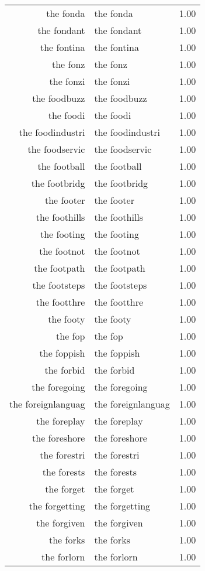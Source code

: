 \begin{table}[ht]
\begin{tabular}{rlr}
  the fonda & the fonda & 1.00 \\ 
  the fondant & the fondant & 1.00 \\ 
  the fontina & the fontina & 1.00 \\ 
  the fonz & the fonz & 1.00 \\ 
  the fonzi & the fonzi & 1.00 \\ 
  the foodbuzz & the foodbuzz & 1.00 \\ 
  the foodi & the foodi & 1.00 \\ 
  the foodindustri & the foodindustri & 1.00 \\ 
  the foodservic & the foodservic & 1.00 \\ 
  the football & the football & 1.00 \\ 
  the footbridg & the footbridg & 1.00 \\ 
  the footer & the footer & 1.00 \\ 
  the foothills & the foothills & 1.00 \\ 
  the footing & the footing & 1.00 \\ 
  the footnot & the footnot & 1.00 \\ 
  the footpath & the footpath & 1.00 \\ 
  the footsteps & the footsteps & 1.00 \\ 
  the footthre & the footthre & 1.00 \\ 
  the footy & the footy & 1.00 \\ 
  the fop & the fop & 1.00 \\ 
  the foppish & the foppish & 1.00 \\ 
  the forbid & the forbid & 1.00 \\ 
  the foregoing & the foregoing & 1.00 \\ 
  the foreignlanguag & the foreignlanguag & 1.00 \\ 
  the foreplay & the foreplay & 1.00 \\ 
  the foreshore & the foreshore & 1.00 \\ 
  the forestri & the forestri & 1.00 \\ 
  the forests & the forests & 1.00 \\ 
  the forget & the forget & 1.00 \\ 
  the forgetting & the forgetting & 1.00 \\ 
  the forgiven & the forgiven & 1.00 \\ 
  the forks & the forks & 1.00 \\ 
  the forlorn & the forlorn & 1.00 \\ 

\end{tabular}
\end{table}
